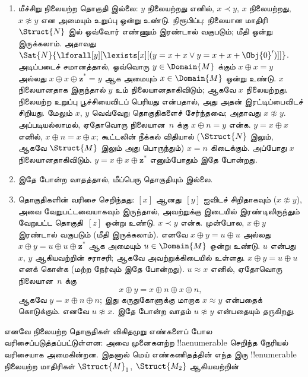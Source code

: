 \documentclass[../../../include/open-logic-section]{subfiles}
\begin{document}
\begin{enumerate}
\item மீச்சிறு நிலையற்ற தொகுதி இல்லை:
  $y$ நிலையற்றது எனில், $x \prec y$,
  $x$ நிலையற்றது, $x \not\approx y$
  என அமையும் உறுப்பு ஒன்று உண்டு.
  நிரூபிப்பு: நிலையான மாதிரி~$\Struct{N}$ இல்
  ஒவ்வோர் எண்ணும் இரண்டால் வகுபடும்; மீதி ஒன்று
  இருக்கலாம். அதாவது
  $\Sat{N}{\lforall[y][\lexists[x][(y = x + x \lor y = x + x +
        \Obj{0}')]]}$.
  அடிப்படைச் சமானத்தால், ஒவ்வொரு
  $y \in \Domain{M}$ க்கும்
  $x \oplus x = y$ அல்லது
  $x \oplus x \oplus \mathbf{z}^*= y$
  ஆக அமையும் $x \in \Domain{M}$ ஒன்று உண்டு.
  $x$ நிலையானதாக இருந்தால் $y$ உம்
  நிலையானதாகிவிடும்; ஆகவே $x$ நிலையற்றது.
  நிலையற்ற உறுப்பு பூச்சியைவிடப் பெரியது
  என்பதால், அது அதன் இரட்டிப்பைவிடச் சிறியது.
  மேலும் $x$, $y$ வெவ்வேறு தொகுதிகளைச்
  சேர்ந்தவை; அதாவது $x \not\approx y$.
  அப்படியல்லாமல், ஏதோவொரு நிலையான~$n$
  க்கு $x \oplus n = y$ என்க.
  $y = x \oplus x$ எனில்,
  $x \oplus n = x \oplus x$;
  கூட்டலின் நீக்கல் விதியால்
  ($\Struct{N}$ இலும், ஆகவே $\Struct{M}$
  இலும் அது பொருந்தும்) $x = n$ கிடைக்கும்.
  அப்போது $x$ நிலையானதாகிவிடும்.
  $y = x \oplus x \oplus \mathbf{z}^*$
  எனும்போதும் இதே போன்றது.
\item இதே போன்ற வாதத்தால், மீப்பெரு தொகுதியும் இல்லை.
\item தொகுதிகளின் வரிசை செறிந்தது:
  $[x]$ ஆனது~$[y]$ ஐவிடச் சிறிதாகவும்
  ($x \not\approx y$), அவை வேறுபட்டவையாகவும்
  இருந்தால், அவற்றுக்கு இடையில் இரண்டிலிருந்தும்
  வேறுபட்ட தொகுதி~$[z]$ ஒன்று உண்டு.
  $x \prec y$ என்க. முன்போல,
  $x \oplus y$ இரண்டால் வகுபடும்
  (மீதி இருக்கலாம்). எனவே
  $x \oplus y = u \oplus u$ அல்லது
  $x \oplus y = u \oplus u \oplus \mathbf{z}^*$
  ஆக அமையும் $u
  \in \Domain{M}$ ஒன்று உண்டு.
  $u$ என்பது $x$, $y$ ஆகியவற்றின்
  சராசரி; ஆகவே அவற்றுக்கிடையில் உள்ளது.
  $x \oplus y = u \oplus u$ எனக் கொள்க
  (மற்ற நேர்வும் இதே போன்றது).
  $u \approx x$ எனில், ஏதோவொரு
  நிலையான~$n$ க்கு
  \[
  x \oplus y = x \oplus n \oplus x \oplus n,
  \]
  ஆகவே $y = x \oplus n \oplus n$;
  இது கருதுகோளுக்கு மாறாக $x \approx y$
  என்பதைக் கொடுக்கும். எனவே
  $u \not\approx x$. இதே போன்ற வாதம்
  $u \not\approx y$ என்பதையும் தருகிறது.
\end{enumerate}
எனவே நிலையற்ற தொகுதிகள் விகிதமுறு எண்களைப்
போல வரிசைப்படுத்தப்பட்டுள்ளன: அவை முனைகளற்ற
!!a{enumerable} செறிந்த நேரியல் வரிசையாக அமைகின்றன.
இதனால் மெய் எண்கணிதத்தின் எந்த இரு
!!{enumerable} நிலையற்ற மாதிரிகள்
$\Struct{M}_1$, $\Struct{M_2}$ ஆகியவற்றின்
\end{document}
